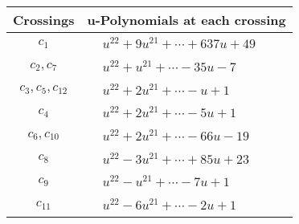 \documentclass[1p]{elsarticle_modified}
\theoremstyle{definition}
\begin{document}
\begin{tabular}{m{50pt}|m{274pt}}
Crossings & \hspace{64pt}u-Polynomials at each crossing \\
\hline $$\begin{aligned}c_{1}\end{aligned}$$&$\begin{aligned}
&u^{22}+9 u^{21}+\cdots+637 u+49
\end{aligned}$\\
\hline $$\begin{aligned}c_{2},c_{7}\end{aligned}$$&$\begin{aligned}
&u^{22}+u^{21}+\cdots-35 u-7
\end{aligned}$\\
\hline $$\begin{aligned}c_{3},c_{5},c_{12}\end{aligned}$$&$\begin{aligned}
&u^{22}+2 u^{21}+\cdots- u+1
\end{aligned}$\\
\hline $$\begin{aligned}c_{4}\end{aligned}$$&$\begin{aligned}
&u^{22}+2 u^{21}+\cdots-5 u+1
\end{aligned}$\\
\hline $$\begin{aligned}c_{6},c_{10}\end{aligned}$$&$\begin{aligned}
&u^{22}+2 u^{21}+\cdots-66 u-19
\end{aligned}$\\
\hline $$\begin{aligned}c_{8}\end{aligned}$$&$\begin{aligned}
&u^{22}-3 u^{21}+\cdots+85 u+23
\end{aligned}$\\
\hline $$\begin{aligned}c_{9}\end{aligned}$$&$\begin{aligned}
&u^{22}- u^{21}+\cdots-7 u+1
\end{aligned}$\\
\hline $$\begin{aligned}c_{11}\end{aligned}$$&$\begin{aligned}
&u^{22}-6 u^{21}+\cdots-2 u+1
\end{aligned}$\\
\hline
\end{tabular}\\~\\
\end{document}
